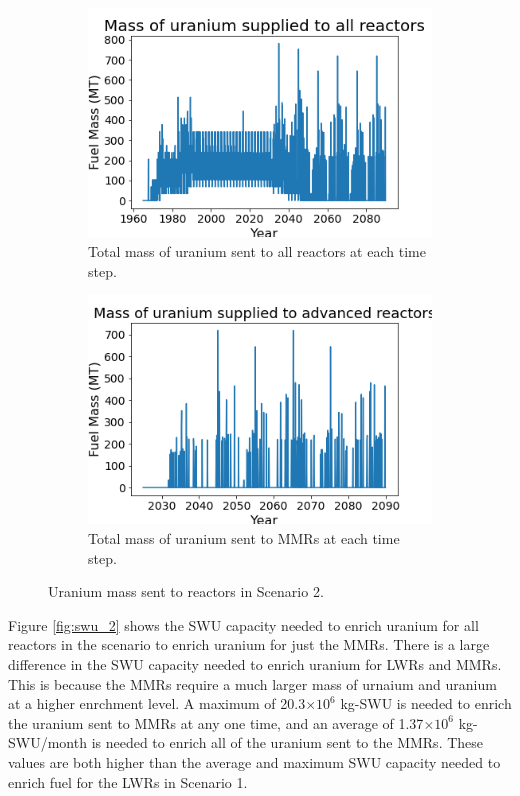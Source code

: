 \begin{figure}
    \centering
    \begin{subfigure}{0.4\textwidth}
        \centering
        \includegraphics[scale=0.3]{figures/fuelsupply_scenarios_2.png}
        \caption{Total mass of uranium sent to all reactors at each time step.}
        \label{fig:totalfuel_2}
    \end{subfigure}
    \begin{subfigure}{0.4\textwidth}
        \centering
        \includegraphics[scale=0.3]{figures/advancedRX_fuelsupply_scenarios_2.png}
        \caption{Total mass of uranium sent to \glspl{MMR} at each time step.}
        \label{fig:haleu_2}
    \end{subfigure}
    \caption{Uranium mass sent to reactors in Scenario 2.}
    \label{fig:fuel_2}
\end{figure}

Figure \ref{fig:swu_2} shows the \gls{SWU} capacity needed to 
enrich uranium for all reactors in the scenario to enrich uranium for 
just the \glspl{MMR}. There is a large difference in the \gls{SWU} 
capacity needed to enrich uranium for \glspl{LWR} and \glspl{MMR}. This 
is because the \glspl{MMR} require a much larger mass of urnaium and 
uranium at a higher enrchment level. A maximum of 20.3$\times 10^6$ kg-\gls{SWU}
is needed to enrich the uranium sent to \glspl{MMR} at any one time, and 
an average of 1.37$\times 10^6$ kg-\gls{SWU}/month is needed to enrich all of the 
uranium sent to the \glspl{MMR}. These values are both higher than the 
average and maximum \gls{SWU} capacity needed to enrich fuel for the 
\glspl{LWR} in Scenario 1. 


